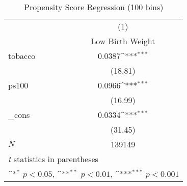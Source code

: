 \begin{table}[htbp]\centering
\def\sym#1{\ifmmode^{#1}\else\(^{#1}\)\fi}
\caption{Propensity Score Regression (100 bins)\label{h1}}
\begin{tabular}{l*{1}{c}}
\hline\hline
            &\multicolumn{1}{c}{(1)}\\
            &\multicolumn{1}{c}{Low Birth Weight}\\
\hline
tobacco     &      0.0387\sym{***}\\
            &     (18.81)         \\
[1em]
ps100       &      0.0966\sym{***}\\
            &     (16.99)         \\
[1em]
\_cons      &      0.0334\sym{***}\\
            &     (31.45)         \\
\hline
\(N\)       &      139149         \\
\hline\hline
\multicolumn{2}{l}{\footnotesize \textit{t} statistics in parentheses}\\
\multicolumn{2}{l}{\footnotesize \sym{*} \(p<0.05\), \sym{**} \(p<0.01\), \sym{***} \(p<0.001\)}\\
\end{tabular}
\end{table}
